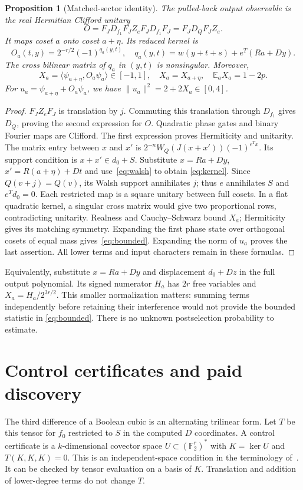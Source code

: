\documentclass[11pt]{article}
\newtheorem{proposition}[theorem]{Proposition}
\newcommand{\F}{\mathbb F_2}
\newcommand{\E}{\mathbb E}
\newcommand{\norm}[1]{\lVert #1\rVert}
\begin{document}
\begin{proposition}[Matched-sector identity]\label{prop:sector}
The pulled-back output observable is the real Hermitian Clifford unitary
\[
 O=F_JD_{f_1}F_J Z_e F_JD_{f_1}F_J=F_JD_QF_JZ_e.
\]
It maps coset $a$ onto coset $a+\eta$. Its reduced kernel is
\begin{equation}\label{eq:kernel}
 O_a(t,y)=2^{-r/2}(-1)^{q_a(y,t)},\quad
 q_a(y,t)=w(y+t+s)+e^T(Ra+Dy).
\end{equation}
The cross bilinear matrix of $q_a$ in $(y,t)$ is nonsingular. Moreover,
\begin{equation}\label{eq:bounded}
 X_a=\langle\psi_{a+\eta},O_a\psi_a\rangle\in[-1,1],\quad
 X_a=X_{a+\eta},\quad \E_a X_a=1-2p.
\end{equation}
For $u_a=\psi_{a+\eta}+O_a\psi_a$, we have
$\norm{u_a}^2=2+2X_a\in[0,4]$.
\end{proposition}
\begin{proof}
$F_JZ_eF_J$ is translation by $j$. Commuting this translation through $D_{f_1}$
gives $D_Q$, proving the second expression for $O$. Quadratic phase gates and binary
Fourier maps are Clifford. The first expression proves Hermiticity and unitarity.
The matrix entry between $x$ and $x'$ is
$2^{-n}W_Q(J(x+x'))(-1)^{e^Tx}$. Its support condition is $x+x'\in d_0+S$.
Substitute $x=Ra+Dy$, $x'=R(a+\eta)+Dt$ and use~\eqref{eq:walsh} to obtain
\eqref{eq:kernel}. Since $Q(v+j)=Q(v)$, its Walsh support annihilates $j$;
thus $e$ annihilates $S$ and $e^Td_0=0$. Each restricted map is a square unitary
between full cosets. In a flat quadratic kernel, a singular cross matrix would give
two proportional rows, contradicting unitarity. Realness and Cauchy--Schwarz bound
$X_a$; Hermiticity gives its matching symmetry. Expanding the first phase state over
orthogonal cosets of equal mass gives~\eqref{eq:bounded}. Expanding the norm of $u_a$
proves the last assertion. All lower terms and input characters remain in these formulas.
\end{proof}

Equivalently, substitute $x=Ra+Dy$ and displacement $d_0+Dz$ in the full output
polynomial. Its signed numerator $H_a$ has $2r$ free variables and
$X_a=H_a/2^{3r/2}$. This smaller normalization matters: summing terms independently
before retaining their interference would not provide the bounded statistic in
\eqref{eq:bounded}. There is no unknown postselection probability to estimate.

\section{Control certificates and paid discovery}\label{sec:discovery}
The third difference of a Boolean cubic is an alternating trilinear form. Let $T$
be this tensor for $f_0$ restricted to $S$ in the computed $D$ coordinates.
A control certificate is a $k$-dimensional covector space $U\subset(\F^r)^*$ with
$K=\ker U$ and $T(K,K,K)=0$. This is an independent-space condition in the terminology
of~\cite{blaser2026}. It can be checked by tensor evaluation on a basis of $K$.
Translation and addition of lower-degree terms do not change $T$.
\end{document}
